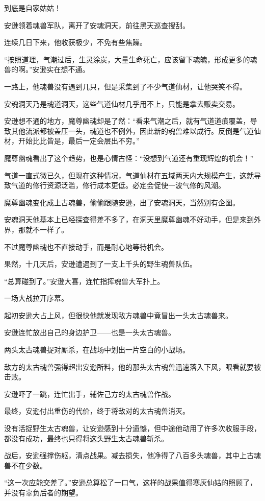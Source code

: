 \begin{this_body}
到底是自家姑姑！

安逊领着魂兽军队，离开了安魂洞天，前往黑天巡查搜刮。

连续几日下来，他收获极少，不免有些焦躁。

“按照道理，气潮过后，生灵涂炭，大量生命死亡，应该留下魂魄，形成更多的魂兽的啊。”安逊实在想不通。

一路上，他魂兽没有遇到几只，但是采集到了不少气道仙材，让他哭笑不得。

安魂洞天乃是魂道洞天，这些气道仙材几乎用不上，只能是拿去贩卖交易。

安逊想不通的地方，魔尊幽魂却是了然：“看来气潮之后，就有气道道痕覆盖，导致其他流派都被盖压一头，魂道也不例外，因此新的魂兽难以成行。反倒是气道仙材，开始比比皆是，最后一定会层出不穷。”

魔尊幽魂看出了这个趋势，也是心情古怪：“没想到气道还有重现辉煌的机会！”

气道一直式微已久，但现在这种情况，气道仙材在五域两天内大规模产生，这就导致气道的修行资源泛滥，修行成本更低。必定会促使一波气修的风潮。

魔尊幽魂变化成上古魂兽，偷偷跟随安逊，出了安魂洞天，当然别有企图。

安魂洞天他基本上已经探查得差不多了，在洞天里魔尊幽魂不好动手，但是来到外界，那就不一样了。

不过魔尊幽魂也不直接动手，而是耐心地等待机会。

果然，十几天后，安逊遭遇到了一支上千头的野生魂兽队伍。

“总算碰到了。”安逊大喜，连忙指挥魂兽大军扑上。

一场大战拉开序幕。

起初安逊大占上风，但很快他就发现敌方魂兽中竟冒出一头太古魂兽来。

安逊连忙放出自己的身边护卫——也是一头太古魂兽。

两头太古魂兽捉对厮杀，在战场中划出一片空白的小战场。

敌方的太古魂兽强得超出安逊所料，他的那头太古魂兽迅速落入下风，眼看就要被击败。

安逊吓了一跳，连忙出手，辅佐己方的太古魂兽作战。

最终，安逊付出重伤的代价，终于将敌对的太古魂兽消灭。

没有活捉野生太古魂兽，让安逊感到十分遗憾，但中途他动用了许多次收服手段，都没有成功，最终也只得将这头野生太古魂兽斩杀。

战后，安逊强撑伤躯，清点战果。减去损失，他净得了八百多头魂兽，其中上古魂兽不在少数。

“这一次应能交差了。”安逊总算松了一口气，这样的战果值得寒灰仙姑的照顾了，并没有辜负后者的期望。


\end{this_body}
